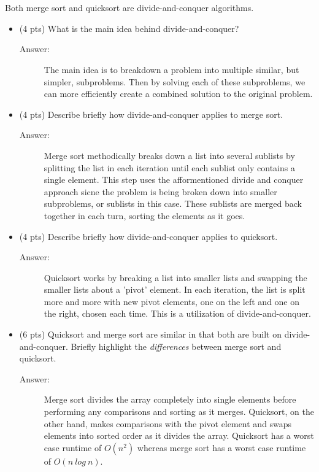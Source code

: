 \documentclass[11pt]{article}
\begin{document}
\section{}
\label{sec:org78cd8d6}
Both merge sort and quicksort are divide-and-conquer algorithms.

\begin{itemize}
\item (4 pts) What is the main idea behind divide-and-conquer?
\begin{description}
    \item[Answer:] The main idea is to breakdown a problem into multiple similar, but simpler, subproblems. Then by solving each of these subproblems, we can more efficiently create a combined solution to the original problem.
\end{description}

\item (4 pts) Describe briefly how divide-and-conquer applies to merge sort.
\begin{description}
    \item[Answer:] Merge sort methodically breaks down a list into several sublists by splitting the list in each iteration until each sublist only contains a single element. This step uses the afformentioned divide and conquer approach sicne the problem is being broken down into smaller subproblems, or sublists in this case. These sublists are merged back together in each turn, sorting the elements as it goes.
\end{description}

\item (4 pts) Describe briefly how divide-and-conquer applies to quicksort.
\begin{description}
    \item[Answer:] Quicksort works by breaking a list into smaller lists and swapping the smaller lists about a ’pivot’ element. In each iteration, the list is split more and more with new pivot elements, one on the left and one on the right, chosen each time. This is a utilization of divide-and-conquer.
\end{description}

\item (6 pts) Quicksort and merge sort are similar in that both are built on
divide-and-conquer. Briefly highlight the \emph{differences} between merge sort
and quicksort.
\begin{description}
    \item[Answer:] Merge sort divides the array completely into single elements before performing any comparisons and sorting as it merges. Quicksort, on the other hand, makes comparisons with the pivot element and swaps elements into sorted order as it divides the array. Quicksort has a worst case runtime of $O(n^2)$ whereas merge sort has a worst case runtime of $O(n~log~n)$.
\end{description}


\end{itemize}
\end{document}
